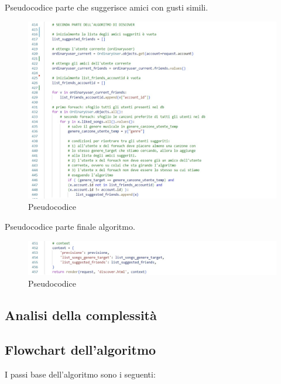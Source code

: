 \newpage
Pseudocodice parte che suggerisce amici con gusti simili. 
\begin{figure}[H]
    \centering
    \includegraphics[scale=0.7]{images/alg3.jpg}
    \caption{Pseudocodice}
    \label{fig-pseudocodice-3}
\end{figure}


\newpage
Pseudocodice parte finale algoritmo. 
\begin{figure}[H]
    \centering
    \includegraphics[scale=0.7]{images/alg4.jpg}
    \caption{Pseudocodice}
    \label{fig-pseudocodice-4}
\end{figure}



\newpage


\subsection{Analisi della complessità}


\newpage
\subsection{Flowchart dell'algoritmo}
I passi base dell'algoritmo sono i seguenti: 